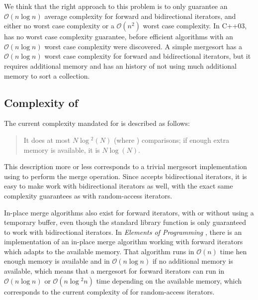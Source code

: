 \documentclass{isocpp_proposal}
\begin{document}
\vspace{0.3cm}

We think that the right approach to this  problem is to only guarantee an $\mathcal{O}(n \log{} n)$ average complexity for forward and bidirectional iterators, and either no worst case complexity or a $\mathcal{O}(n^2)$ worst case complexity. In C++03,  has no worst case complexity guarantee, before efficient algorithms with an $\mathcal{O}(n \log{} n)$ worst case complexity were discovered. A simple mergesort has a $\mathcal{O}(n \log{} n)$ worst case complexity for forward and bidirectional iterators, but it requires additional memory and  has an history of not using much additional memory to sort a collection.

\subsection{Complexity of }

The current complexity mandated for  is described as follows: 

\begin{quotation}
It does at most $N \log{}^2 (N)$ (where ) comparisons; if enough extra memory is available, it is  $N \log{} (N)$.
\end{quotation}

This description more or less corresponds to a trivial mergesort implementation using  to perform the merge operation. Since  accepts bidirectional iterators, it is easy to make  work with bidirectional iterators as well, with the exact same complexity guarantees as with random-access iterators.

\vspace{0.3cm}

In-place merge algorithms also exist for forward iterators, with or without using a temporary buffer, even though the standard library function  is only guaranteed to work with bidirectional iterators. In \emph{Elements of Programming} \cite{EOP}, there is an implementation of an in-place merge algorithm working with forward iterators which adapts to the available memory. That algorithm runs in $\mathcal{O}(n)$ time hen enough memory is available and in $\mathcal{O}(n \log{} n)$ if no additional memory is available, which means that a mergesort for forward iterators can run in $\mathcal{O}(n \log{} n)$ or $\mathcal{O}(n \log{}^2 n)$ time depending on the available memory, which corresponds to the current complexity of  for random-access iterators.
\end{document}
